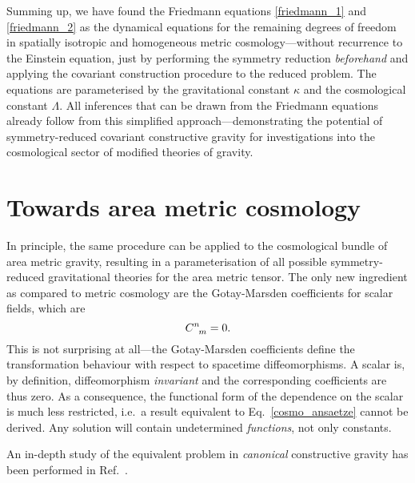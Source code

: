 Summing up, we have found the Friedmann equations \eqref{friedmann_1} and \eqref{friedmann_2} as the dynamical equations for the remaining degrees of freedom in spatially isotropic and homogeneous metric cosmology---without recurrence to the Einstein equation, just by performing the symmetry reduction \emph{beforehand} and applying the covariant construction procedure to the reduced problem. The equations are parameterised by the gravitational constant $\kappa$ and the cosmological constant $\Lambda$. All inferences that can be drawn from the Friedmann equations already follow from this simplified approach---demonstrating the potential of symmetry-reduced covariant constructive gravity for investigations into the cosmological sector of modified theories of gravity.

\section{Towards area metric cosmology}

In principle, the same procedure can be applied to the cosmological bundle of area metric gravity, resulting in a parameterisation of all possible symmetry-reduced gravitational theories for the area metric tensor. The only new ingredient as compared to metric cosmology are the Gotay-Marsden coefficients for scalar fields, which are
\begin{equation}
  \gmc{}{}{n}{m} = 0.
\end{equation}
This is not surprising at all---the Gotay-Marsden coefficients define the transformation behaviour with respect to spacetime diffeomorphisms. A scalar is, by definition, diffeomorphism \emph{invariant} and the corresponding coefficients are thus zero. As a consequence, the functional form of the dependence on the scalar is much less restricted, i.e.\ a result equivalent to Eq.~\eqref{cosmo_ansaetze} cannot be derived. Any solution will contain undetermined \emph{functions}, not only constants.

An in-depth study of the equivalent problem in \emph{canonical} constructive gravity has been performed in Ref.\ \cite{Duell_2020}.

